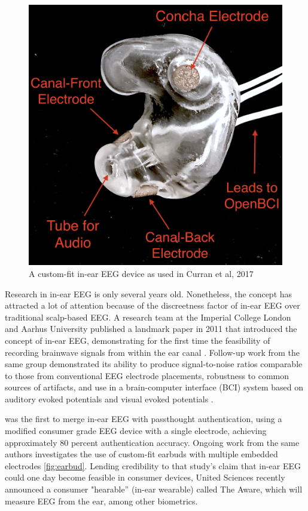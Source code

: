 \documentclass[sigconf]{acmart}
\begin{document}
\label{fig:earbud}
\begin{figure}[t!]
\centering
\includegraphics[width=.9\linewidth]{./figures/custom-fit-eeg-annotated.jpg}
\caption{A custom-fit in-ear EEG device as used in Curran et al, 2017}
\end{figure}

Research in in-ear EEG is only several years old. Nonetheless, the concept has
attracted a lot of attention because of the discreetness factor of in-ear EEG over
traditional scalp-based EEG. A research team at the Imperial College London
and Aarhus University published a landmark paper in 2011 that introduced the
concept of in-ear EEG, demonstrating for the first time the feasibility of recording
brainwave signals from within the ear canal
\cite{Looney2011}.
Follow-up work from the same
group demonstrated its ability to produce signal-to-noise ratios comparable to
those from conventional EEG electrode placements, robustness to common
sources of artifacts, and use in a brain-computer interface (BCI) system based on
auditory evoked potentials and visual evoked potentials
\cite{Looney2012a,Kidmose2013a,Kidmose2013b}.

\cite{curranpassthoughts} was the first to merge in-ear EEG with passthought authentication,
 using a modified consumer grade EEG device with a single electrode, achieving approximately 80 percent authentication accuracy. 
Ongoing work from the same authors investigates the use of custom-fit earbuds with multiple embedded electrodes \ref{fig:earbud}.
Lending credibility to that study's claim that in-ear EEG could one day become feasible in consumer devices,
United Sciences recently announced a consumer "hearable'' (in-ear wearable) called The Aware, which will measure EEG from the ear, among other biometrics.
\end{document}
